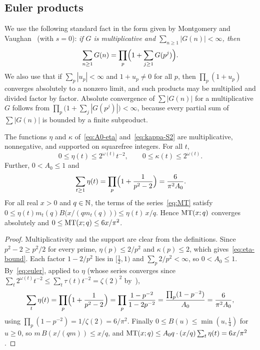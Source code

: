 \subsection{Euler products}

We use the following standard fact in the form given by Montgomery and Vaughan~\cite[Theorem~1.9]{MV2007} (with $s=0$): \emph{if $G$ is multiplicative and $\sum_{n\ge1}|G(n)|<\infty$, then}
\begin{equation}\label{eq:euler}
\sum_{n\ge1}G(n)=\prod_p\Bigl(1+\sum_{j\ge1}G(p^j)\Bigr).
\end{equation}
We also use that if $\sum_p|u_p|<\infty$ and $1+u_p\ne0$ for all $p$, then $\prod_p(1+u_p)$ converges absolutely to a nonzero limit, and such products may be multiplied and divided factor by factor. Absolute convergence of $\sum|G(n)|$ for a multiplicative $G$ follows from $\prod_p\bigl(1+\sum_j|G(p^j)|\bigr)<\infty$, because every partial sum of $\sum|G(n)|$ is bounded by a finite subproduct.

\begin{lemma}\label{lem:eta}
The functions $\eta$ and $\kappa$ of~\eqref{eq:A0-eta} and~\eqref{eq:kappa-S2} are multiplicative, nonnegative, and supported on squarefree integers. For all $t$,
\begin{equation}\label{eq:eta-bound}
0\le\eta(t)\le2^{\omega(t)}t^{-2},\qquad 0\le\kappa(t)\le2^{\omega(t)}.
\end{equation}
Further, $0<A_0\le1$ and
\begin{equation}\label{eq:sum-eta}
\sum_{t\ge1}\eta(t)=\prod_p\Bigl(1+\frac1{p^2-2}\Bigr)=\frac{6}{\pi^2A_0}.
\end{equation}
For all real $x>0$ and $q\in\mathbb{N}$, the terms of the series~\eqref{eq:MT} satisfy $0\le\eta(t)m_t(q)B\bigl(x/(qm_t(q))\bigr)\le\eta(t)\,x/q$. Hence $\mathrm{MT}(x;q)$ converges absolutely and $0\le\mathrm{MT}(x;q)\le 6x/\pi^2$.
\end{lemma}

\begin{proof}
Multiplicativity and the support are clear from the definitions. Since $p^2-2\ge p^2/2$ for every prime, $\eta(p)\le2/p^2$ and $\kappa(p)\le2$, which gives~\eqref{eq:eta-bound}. Each factor $1-2/p^2$ lies in $[\tfrac12,1)$ and $\sum_p2/p^2<\infty$, so $0<A_0\le1$. By~\eqref{eq:euler}, applied to $\eta$ (whose series converges since $\sum_t2^{\omega(t)}t^{-2}\le\sum_t\tau(t)t^{-2}=\zeta(2)^2$ by~\cite[Theorem~1.8]{MV2007}),
\[
\sum_t\eta(t)=\prod_p\Bigl(1+\frac1{p^2-2}\Bigr)=\prod_p\frac{1-p^{-2}}{1-2p^{-2}}=\frac{\prod_p(1-p^{-2})}{A_0}=\frac{6}{\pi^2A_0},
\]
using $\prod_p(1-p^{-2})=1/\zeta(2)=6/\pi^2$. Finally $0\le B(u)\le\min(u,\frac14)$ for $u\ge0$, so $m\,B(x/(qm))\le x/q$, and $\mathrm{MT}(x;q)\le A_0q\cdot(x/q)\sum_t\eta(t)=6x/\pi^2$.
\end{proof}

